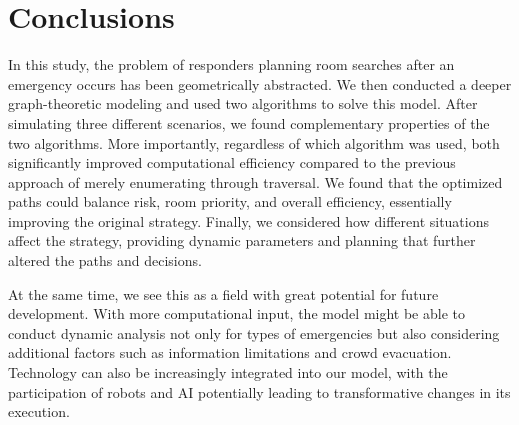 \section{Conclusions}
In this study, the problem of responders planning room searches after an emergency occurs has been geometrically abstracted. We then conducted a deeper graph-theoretic modeling and used two algorithms to solve this model. After simulating three different scenarios, we found complementary properties of the two algorithms. More importantly, regardless of which algorithm was used, both significantly improved computational efficiency compared to the previous approach of merely enumerating through traversal. We found that the optimized paths could balance risk, room priority, and overall efficiency, essentially improving the original strategy. Finally, we considered how different situations affect the strategy, providing dynamic parameters and planning that further altered the paths and decisions. 

At the same time, we see this as a field with great potential for future development. With more computational input, the model might be able to conduct dynamic analysis not only for types of emergencies but also considering additional factors such as information limitations and crowd evacuation. Technology can also be increasingly integrated into our model, with the participation of robots and AI potentially leading to transformative changes in its execution.
